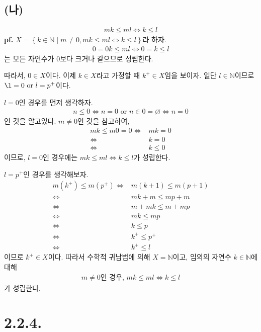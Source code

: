 \documentclass{article}
\begin{document}
\subsection{(나)}
\begin{align*}
mk \le ml \iff k \le l \tag{단, $m \neq 0$}
\end{align*}
\textbf{pf.} $X = \left\{ k \in \mathbb{N} \mid m \neq 0,  mk \le ml \iff k \le l \right\}$라 하자.
\begin{align*}
0=0k \leq ml \iff 0=k \leq l
\end{align*}는 모든 자연수가 $0$보다 크거나 같으므로 성립한다. 

따라서, $0 \in X$이다. 이제 $k \in X$라고 가정할 때 $k^+ \in X$임을 보이자. 일단 $l \in \mathbb{N}$이므로 $\l = 0 \text{ or } l = p^+$이다.

$l = 0$인 경우를 먼저 생각하자. 
\begin{align*}
n \le 0 \iff n = 0 \text{ or } n \in 0 = \varnothing \iff n = 0
\end{align*}인 것을 알고있다. $m \neq 0$인 것을 참고하여,
\begin{align*}
mk \le m0 = 0 \iff& mk = 0
\\ \iff& k = 0
\\ \iff& k \le 0
\end{align*}이므로, $l=0$인 경우에는 $mk \le ml \iff k \le l$가 성립한다.

$l = p^+$인 경우를 생각해보자.
\begin{align*}
m(k^+) \le m(p^+) \iff& m(k+1) \le m(p+1)
\\ \iff& mk + m \le mp + m
\\ \iff& m + mk \le m + mp
\\ \iff& mk \le mp \tag{$\because$ (가)}
\\ \iff& k \le p
\\ \iff& k^+ \le p^+ \tag{$\because$ Lemma 2.}
\\ \iff& k^+ \le l
\end{align*}이므로 $k^+ \in X$이다. 따라서 수학적 귀납법에 의해 $X = \mathbb{N}$이고, 임의의 자연수 $k \in \mathbb{N}$에 대해
\begin{align*}
m \neq 0 \text{인 경우,  }  mk \le ml \iff k \le l
\end{align*}가 성립한다.


\section{2.2.4.}
\end{document}
